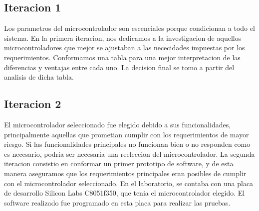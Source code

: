 \subsection{Iteracion 1} %
\label{sub:iteracion_1}

Los parametros del microcontrolador son escenciales porque condicionan a todo el sistema. En la primera iteracion, nos dedicamos a la investigacion de aquellos microcontroladores que mejor se ajustaban a las nececidades impuestas por los requerimientos. Conformamos una tabla para una mejor interpretacion de las diferencias y ventajas entre cada uno. La decision final se tomo a partir del analisis de dicha tabla.



\subsection{Iteracion 2} %
\label{sub:iteracion_2}

El microcontrolador seleccionado fue elegido debido a sus funcionalidades, principalmente aquellas que prometian cumplir con los requerimientos de mayor riesgo. Si las funcionalidades principales no funcionan bien o no responden como es necesario, podria ser necesaria una reeleccion del microcontrolador. La segunda iteracion consistio en conformar un primer prototipo de software, y de esta manera aseguramos que los requerimientos principales eran posibles de cumplir con el microcontrolador seleccionado.
En el laboratorio, se contaba con una placa de desarrollo Silicon Labs C8051f350, que tenia el microcontrolador elegido. El software realizado fue programado en esta placa para realizar las pruebas.

